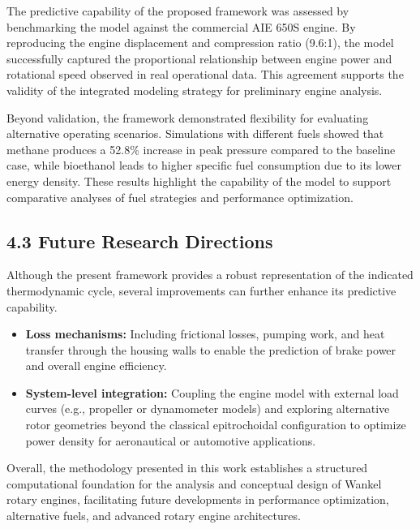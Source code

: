 \documentclass[man,floatsintext,noextraspace]{apa6}
\begin{document}
The predictive capability of the proposed framework was assessed by benchmarking the model against the commercial AIE 650S engine. By reproducing the engine displacement and compression ratio (9.6:1), the model successfully captured the proportional relationship between engine power and rotational speed observed in real operational data. This agreement supports the validity of the integrated modeling strategy for preliminary engine analysis.

Beyond validation, the framework demonstrated flexibility for evaluating alternative operating scenarios. Simulations with different fuels showed that methane produces a 52.8\% increase in peak pressure compared to the baseline case, while bioethanol leads to higher specific fuel consumption due to its lower energy density. These results highlight the capability of the model to support comparative analyses of fuel strategies and performance optimization.

\subsection{4.3 Future Research Directions}

Although the present framework provides a robust representation of the indicated thermodynamic cycle, several improvements can further enhance its predictive capability.

\begin{itemize}
    
    \item \textbf{Loss mechanisms:} Including frictional losses, pumping work, and heat transfer through the housing walls to enable the prediction of brake power and overall engine efficiency.
    
    \item \textbf{System-level integration:} Coupling the engine model with external load curves (e.g., propeller or dynamometer models) and exploring alternative rotor geometries beyond the classical epitrochoidal configuration to optimize power density for aeronautical or automotive applications.
\end{itemize}

Overall, the methodology presented in this work establishes a structured computational foundation for the analysis and conceptual design of Wankel rotary engines, facilitating future developments in performance optimization, alternative fuels, and advanced rotary engine architectures.




 
\end{document}
